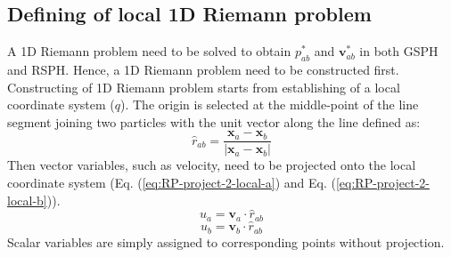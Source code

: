\subsection{Defining of local 1D Riemann problem} \label{sec:RP-construction}
A 1D Riemann problem need to be solved to obtain  $p_{a b}^{\ast}$ and $\textbf{v}_{a b}^{\ast}$ in both GSPH and RSPH. Hence, a 1D Riemann problem need to be constructed first. Constructing of 1D Riemann problem starts from establishing of a local coordinate system ($q$). The origin is selected at the middle-point of the line segment joining two particles with the unit vector along the line defined as: 
\begin{equation}
\hat{r}_{a b}= \frac{\textbf{x}_{a} - \textbf{x}_{ b}}{|\textbf{x}_{a} - \textbf{x}_{ b}|}
\end{equation}
Then vector variables, such as velocity, need to be projected onto the local coordinate system (Eq. (\ref{eq:RP-project-2-local-a}) and Eq. (\ref{eq:RP-project-2-local-b})). 
\begin{equation}
u_{a}= \textbf{v}_{a} \cdot \hat{r}_{a b}
\label{eq:RP-project-2-local-a}
\end{equation}
\begin{equation}
u_{b}= \textbf{v}_{b} \cdot \hat{r}_{a b}
\label{eq:RP-project-2-local-b}
\end{equation}
Scalar variables are simply assigned to corresponding points without projection.

